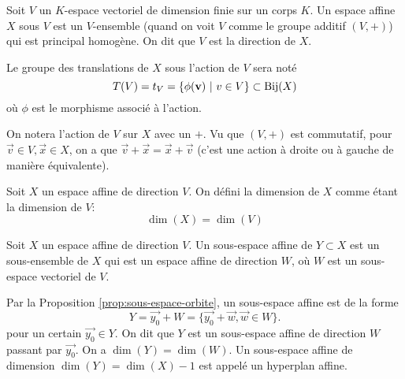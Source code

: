 \begin{definition}
	Soit $V$ un $K$-espace vectoriel de dimension finie sur un corps $K$. Un
	espace affine $X$ sous $V$ est un $V$-ensemble (quand on voit $V$ comme le
	groupe additif $(V, +)$) qui est principal homogène. On dit que $V$ est la
	direction de $X$. 
\end{definition}

\begin{notation}
	Le groupe des translations de $X$ sous l'action de $V$ sera noté
	\begin{equation*}
		T(V) = t_V = \{\phi(\vec{v})\ |\ v \in V\} \subset \Bij(X)
	\end{equation*}
	où $\phi$ est le morphisme associé à l'action.
\end{notation}

\begin{notation}
	On notera l'action de $V$ sur $X$ avec un $+$. Vu que $(V, +)$ est
	commutatif, pour $\vec{v} \in V, \vec{x} \in X$, on a que $\vec{v} + \vec{x}
	= \vec{x} + \vec{v}$ (c'est une action à droite ou à gauche de manière
	équivalente).
\end{notation}

\begin{definition}
	Soit $X$ un espace affine de direction $V$. On défini la dimension de $X$
	comme étant la dimension de $V$:
	\begin{equation*}
		\dim(X) = \dim(V)
	\end{equation*}
\end{definition}

\begin{definition}
	Soit $X$ un espace affine de direction $V$. Un sous-espace affine de $Y
	\subset X$ est un sous-ensemble de $X$ qui est un espace affine de direction
	$W$, où $W$ est un sous-espace vectoriel de $V$.
\end{definition}

\begin{remark}
	Par la Proposition \ref{prop:sous-espace-orbite}, un sous-espace affine est
	de la forme
	\begin{equation*}
		Y = \vec{y_0} + W = \{\vec{y_0} + \vec{w}, \vec{w} \in W\}.
	\end{equation*}
	pour un certain $\vec{y_0} \in Y$. On dit que $Y$ est un sous-espace affine
	de direction $W$ passant par $\vec{y_0}$. On a $\dim(Y) = \dim(W)$. Un
	sous-espace affine de dimension $\dim(Y) = \dim(X) - 1$ est appelé un
	hyperplan affine.
\end{remark}

